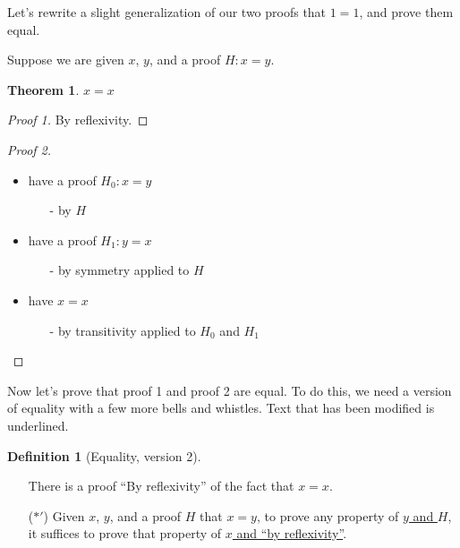 \documentclass{article}
\newtheorem*{thm*}{Theorem}
\theoremstyle{definition}
\newtheorem*{defn*}{Definition}
\begin{document}
Let's rewrite a slight generalization of our two proofs that $1 = 1$, and prove them equal.

{\setlength{\parskip}{0pt}%
Suppose we are given $x$, $y$, and a proof $H : x = y$.
\begin{thm*} $x = x$
\end{thm*}
\begin{proof}[Proof 1]
  By reflexivity.
\end{proof}
\begin{proof}[Proof 2]
$\left.\right.$\\
  \begin{itemize}
    \item have a proof $H_0 : x = y$
    \begin{itemize}
      \item[-] by $H$
    \end{itemize}
    \item have a proof $H_1 : y = x$
      \begin{itemize}
        \item[-] by symmetry applied to $H$
      \end{itemize}
    \item have $x = x$
      \begin{itemize}
        \item[-] by transitivity applied to $H_0$ and $H_1$
      \end{itemize}
  \end{itemize}
\end{proof}
}

Now let's prove that proof 1 and proof 2 are equal.  To do this, we need a version of equality with a few more bells and whistles.  Text that has been modified is underlined.

{\setlength{\parskip}{0pt}%
\begin{defn*}[Equality, version 2]
$\left.\right.$\\
\begin{enumerate}
\item[] There is a proof ``By reflexivity'' of the fact that $x = x$.
\item[($\ast'$)] Given $x$, $y$, and a proof \underline{$H$} that $x = y$, to prove any property of \underline{$y$ and $H$}, it suffices to prove that property of \underline{$x$ and ``by reflexivity''}.
\end{enumerate}
\end{defn*}
}
\end{document}
